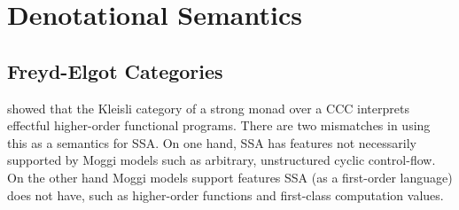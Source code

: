 \documentclass[acmsmall,screen,review]{acmart}
\begin{document}
\section{Denotational Semantics}

\label{sec:densem}

\subsection{Freyd-Elgot Categories}

\citet{moggi-91-monad} showed that the Kleisli category of a strong
monad over a CCC interprets effectful higher-order functional
programs. There are two mismatches in using this as a semantics for
SSA. On one hand, SSA has features not necessarily supported by Moggi
models such as arbitrary, unstructured cyclic control-flow. On the
other hand Moggi models support features SSA (as a first-order
language) does not have, such as higher-order functions and
first-class computation values.
\end{document}
